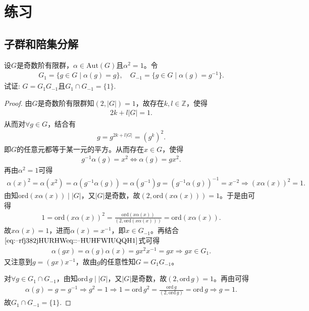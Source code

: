 \documentclass[../../main.tex]{subfiles}%
\begin{document}
\section{练习}

\subsection{子群和陪集分解}

\begin{example}
设$G$是奇数阶有限群，$\alpha \in \mathrm{Aut}(G)$且$\alpha^2 = 1$。令
\begin{align*}
G_1 = \{g \in G \mid \alpha(g) = g\}, \quad
G_{-1} = \{g \in G \mid \alpha(g) = g^{-1}\}.
\end{align*}
试证: $G = G_1G_{-1}$且$G_1 \cap G_{-1} = \{1\}$.
\end{example}
\begin{proof}
由$G$是奇数阶有限群知$(2,|G|)=1$，故存在$k,l\in\mathbb{Z}$，使得
\begin{align*}
2k+l|G|=1.
\end{align*}
从而对$\forall g\in G$，结合有
\begin{align*}
g=g^{2k+l|G|}=(g^k)^2.
\end{align*}
即$G$的任意元都等于某一元的平方。从而存在$x\in G$，使得
\begin{align}
g^{-1}\alpha(g)=x^2\Longleftrightarrow \alpha(g)=gx^2.\label{eq:--rfj382jHURHWeq::--HUHFWIUQQH1}
\end{align}
再由$\alpha^2=1$可得
\begin{align*}
\alpha(x)^2=\alpha(x^2)=\alpha(g^{-1}\alpha(g))=\alpha(g^{-1})g=(g^{-1}\alpha(g))^{-1}=x^{-2}\Longrightarrow (x\alpha(x))^2=1.
\end{align*}
由知$\mathrm{ord}(x\alpha(x))\mid|G|$，又$|G|$是奇数，故$(2,\mathrm{ord}(x\alpha(x)))=1$。于是由可得
\begin{align*}
1=\mathrm{ord}(x\alpha(x))^2=\frac{\mathrm{ord}(x\alpha(x))}{(2,\mathrm{ord}(x\alpha(x)))}=\mathrm{ord}(x\alpha(x)).
\end{align*}
故$x\alpha(x)=1$，进而$\alpha(x)=x^{-1}$，即$x\in G_{-1}$。再结合$\eqref{eq:--rfj382jHURHWeq::--HUHFWIUQQH1}$式可得
\begin{align*}
\alpha(gx)=\alpha(g)\alpha(x)=gx^2x^{-1}=gx\Longrightarrow gx\in G_1.
\end{align*}
又注意到$g=(gx)x^{-1}$，故由$g$的任意性知$G=G_1G_{-1}$。

对$\forall g\in G_1\cap G_{-1}$，由知$\mathrm{ord}\,g\mid|G|$，又$|G|$是奇数，故$(2,\mathrm{ord}\,g)=1$。再由可得
\begin{align*}
\alpha(g)=g=g^{-1}\Longrightarrow g^2=1\Longrightarrow 1=\mathrm{ord}\,g^2=\frac{\mathrm{ord}\,g}{(2,\mathrm{ord}\,g)}=\mathrm{ord}\,g\Longrightarrow g=1.
\end{align*}
故$G_1\cap G_{-1}=\{1\}$.
\end{proof}
\end{document}
